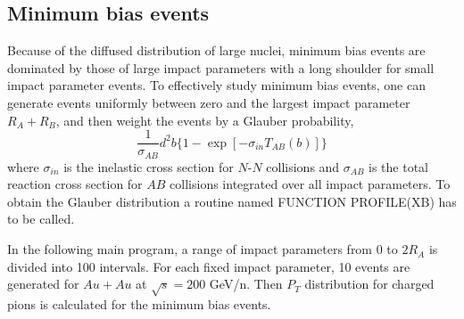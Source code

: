\subsection{Minimum bias events}

        Because of the diffused distribution of large nuclei, minimum
bias events are dominated by those of large impact parameters with a
long shoulder for small impact parameter events. 
To effectively study minimum
bias events, one can generate events uniformly between zero and
the largest impact parameter $R_A+R_B$, and then weight the events by
a Glauber probability,
\begin{equation}
        \frac{1}{\sigma_{AB}}d^2b\{1-\exp[-\sigma_{in}T_{AB}(b)]\}
\end{equation}
where $\sigma_{in}$ is the inelastic cross section for $N$-$N$ collisions and
$\sigma_{AB}$ is the total reaction cross section for $AB$ collisions
integrated over all impact parameters. To obtain the Glauber distribution
a routine named FUNCTION PROFILE(XB) has to be called.

        In the following main program, a range of impact parameters
from 0 to $2R_A$ is divided into 100 intervals. For each fixed
impact parameter, 10 events are generated for $Au+Au$ at $\sqrt{s}=200$ GeV/n. 
Then $P_T$ distribution for charged pions is calculated for
the minimum bias events.

